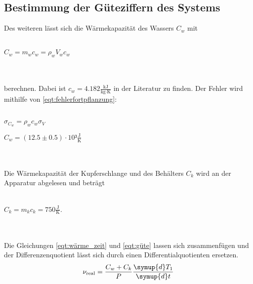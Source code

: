 \newpage
\subsection{Bestimmung der Güteziffern des Systems}

Des weiteren lässt sich die Wärmekapazität des Wassers $C_w$ mit
\\ \\
\centerline{$C_w = m_w c_w = \rho_w V_w c_w$}
\\ \\
berechnen. Dabei ist $c_w = 4.182 \frac{\textrm{kJ}}{\textrm{kg$\cdot$K}}$ in der Literatur zu finden. \cite{c-wasser}
Der Fehler wird mithilfe von \eqref{eqt:fehlerfortpflanzung}:
\\ \\
\centerline{$\sigma_\text{$C_w$} = \rho_w c_w \sigma_V$}
\centerline{$C_w = (12.5 \pm 0.5) \cdot 10³ \frac{\textrm{J}}{\textrm{K}}$}
\\ \\
Die Wärmekapazität der Kupferschlange und des Behälters $C_k$ wird an der Apparatur abgelesen und beträgt 
\\ \\
\centerline{$C_k = m_k c_k = 750 \frac{\textrm{J}}{\textrm{K}}$.}
\\ \\
Die Gleichungen \eqref{eqt:wärme_zeit} und \eqref{eqt:güte} lassen sich zusammenfügen und der Differenzenquotient lässt sich durch einen Differentialquotienten ersetzen.
\begin{equation}
  \nu_\text{real} = \frac{C_w + C_k}{P} \frac{\symup{d}T_1}{\symup{d}t}
\end{equation}


